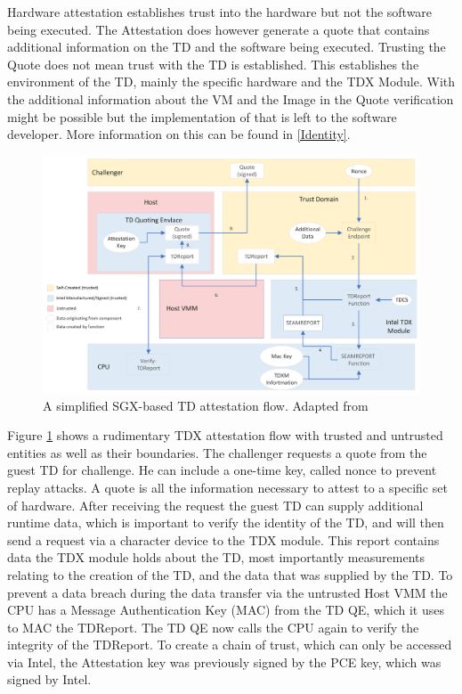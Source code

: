 Hardware attestation establishes trust into the hardware but not the software being executed. The Attestation does however generate a quote that contains additional information on the TD and the software being executed. Trusting the Quote does not mean trust with the TD is established. This establishes the environment of the TD, mainly the specific hardware and the TDX Module. With the additional information about the VM and the Image in the Quote verification might be possible but the implementation of that is left to the software developer. More information on this can be found in \cref{Identity}.
\begin{figure}
\centering
\includegraphics[width=\textwidth]{figures/Attestation-einfach.png}
\caption{A simplified SGX-based TD attestation flow. Adapted from \cite[p.~111]{noauthor_tdx-module-10-public-specpdf_nodate}}
\label{fig:EasyAttestation}
\end{figure}
Figure \ref{fig:EasyAttestation} shows a rudimentary TDX attestation flow with trusted and untrusted entities as well as their boundaries. The challenger requests a quote from the guest TD for challenge. He can include a one-time key, called nonce to prevent replay attacks. A quote is all the information necessary to attest to a specific set of hardware. After receiving the request the guest TD can supply additional runtime data, which is important to verify the identity of the TD, and will then send a request via a character device to the TDX module. This report contains data the TDX module holds about the TD, most importantly measurements relating to the creation of the TD, and the data that was supplied by the TD. To prevent a data breach during the data transfer via the untrusted Host VMM the CPU has a Message Authentication Key (MAC) from the TD QE, which it uses to MAC the TDReport. The TD QE now calls the CPU again to verify the integrity of the TDReport.
To create a chain of trust, which can only be accessed via Intel, the Attestation key was previously signed by the PCE key, which was signed by Intel. 

